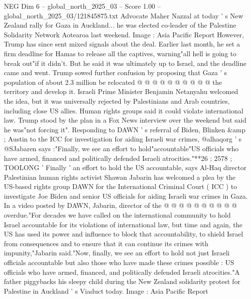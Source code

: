 \begin{textsample}{NEG Dim 6 – global\_north\_2025\_03 – Score 1.00 – global\_north\_2025\_03/121845875.txt}
Advocate Maher Nazzal at today ' s New Zealand rally for Gaza in Auckland... he was elected co-leader of the Palestine Solidarity Network Aotearoa last weekend.
Image : Asia Pacific Report However, Trump has since sent mixed signals about the deal.
Earlier last month, he set a firm deadline for Hamas to release all the captives, warning"all hell is going to break out"if it didn't.
But he said it was ultimately up to Israel, and the deadline came and went.
Trump sowed further confusion by proposing that Gaza ' s population of about 2.3 million be relocated @ @ @ @ @ @ @ @ @ @ the territory and develop it.
Israeli Prime Minister Benjamin Netanyahu welcomed the idea, but it was universally rejected by Palestinians and Arab countries, including close US allies.
Human rights groups said it could violate international law.
Trump stood by the plan in a Fox News interview over the weekend but said he was"not forcing it".
Responding to DAWN ' s referral of Biden, Blinken \&amp ; Austin to the ICC for investigation for aiding Israeli war crimes, @alhaqorg ' s @SJabaren says :"Finally, we see an effort to hold"accountable"US officials who have armed, financed and politically defended Israeli atrocities."**26 ; 2578 ; TOOLONG ' Finally ' an effort to hold the US accountable, says Al-Haq director Palestinian human rights activist Shawan Jabarin has welcomed a plea by the US-based rights group DAWN for the International Criminal Court ( ICC ) to investigate Joe Biden and senior US officials for aiding Israeli war crimes in Gaza.
In a video posted by DAWN, Jabarin, director of the @ @ @ @ @ @ @ @ @ @ overdue."For decades we have called on the international community to hold Israel accountable for its violations of international law, but time and again, the US has used its power and influence to block that accountability, to shield Israel from consequences and to ensure that it can continue its crimes with impunity,"Jabarin said."Now, finally, we see an effort to hold not just Israeli officials accountable but also those who have made these crimes possible : US officials who have armed, financed, and politically defended Israeli atrocities."A father piggybacks his sleepy child during the New Zealand solidarity protest for Palestine in Auckland ' s Viaduct today.
Image : Asia Pacific Report

\end{textsample}
